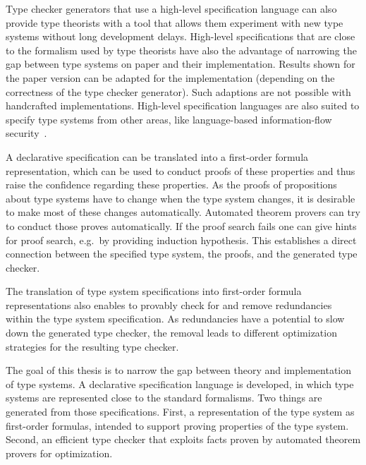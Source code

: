 Type checker generators that use a high-level specification language
can also provide type theorists with a tool that allows them
experiment with new type systems without long development
delays. High-level specifications that are close to the formalism used
by type theorists have also the advantage of narrowing the gap between
type systems on paper and their implementation. Results shown for the
paper version can be adapted for the implementation (depending on the
correctness of the type checker generator). Such adaptions are not
possible with handcrafted implementations. High-level specification
languages are also suited to specify type systems from other areas,
like language-based information-flow
security~\cite{Sabelfeld:2006:LIS:2312191.2314769}.

A declarative specification can be translated into a first-order
formula representation, which can be used to conduct proofs of these
properties and thus raise the confidence regarding these
properties. As the proofs of propositions about type systems have to
change when the type system changes, it is desirable to make most of
these changes automatically. Automated theorem provers can try to
conduct those proves automatically. If the proof search fails one can
give hints for proof search, e.g.\ by providing induction
hypothesis. This establishes a direct connection between the specified
type system, the proofs, and the generated type checker.

The translation of type system specifications into first-order formula
representations also enables to provably check for and remove
redundancies within the type system specification. As redundancies
have a potential to slow down the generated type checker, the removal
leads to different optimization strategies for the resulting type
checker.

The goal of this thesis is to narrow the gap between theory and
implementation of type systems. A declarative specification language
is developed, in which type systems are represented close to the
standard formalisms. Two things are generated from those
specifications. First, a representation of the type system as
first-order formulas, intended to support proving properties of the
type system. Second, an efficient type checker that exploits facts
proven by automated theorem provers for optimization.

